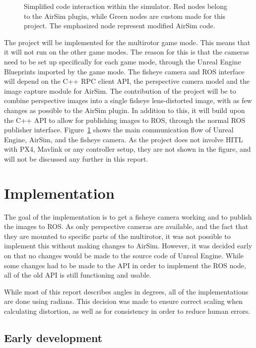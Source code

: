 \begin{figure}[!htb]
\begin{tikzpicture}[node distance=2.2cm, transform shape, scale=0.7]
    \end{tikzpicture}
    \caption{Simplified code interaction within the simulator. Red nodes belong to the AirSim plugin, while Green nodes are custom made for this project. The emphasized node represent modified AirSim code.}
    \label{fig:comm_pattern}
\end{figure}

The project will be implemented for the multirotor game mode. This means that it will not run on the other game modes. The reason for this is that the cameras need to be set up specifically for each game mode, through the Unreal Engine Blueprints imported by the game mode. The fisheye camera and ROS interface will depend on the C++ RPC client API, the perspective camera model and the image capture module for AirSim. The contribution of the project will be to combine perspective images into a single fisheye lens-distorted image, with as few changes as possible to the AirSim plugin. In addition to this, it will build upon the C++ API to allow for publishing images to ROS, through the normal ROS publisher interface. Figure~\ref{fig:comm_pattern} shows the main communication flow of Unreal Engine, AirSim, and the fisheye camera. As the project does not involve HITL with PX4, Mavlink or any controller setup, they are not shown in the figure, and will not be discussed any further in this report.

\section{Implementation}

The goal of the implementation is to get a fisheye camera working and to publish the images to ROS. As only perspective cameras are available, and the fact that they are mounted to specific parts of the multirotor, it was not possible to implement this without making changes to AirSim. However, it was decided early on that no changes would be made to the source code of Unreal Engine. While some changes had to be made to the API in order to implement the ROS node, all of the old API is still functioning and usable.

While most of this report describes angles in degrees, all of the implementations are done using radians. This decision was made to ensure correct scaling when calculating distortion, as well as for consistency in order to reduce human errors.

\subsection{Early development} \label{sec:Early_dev}

